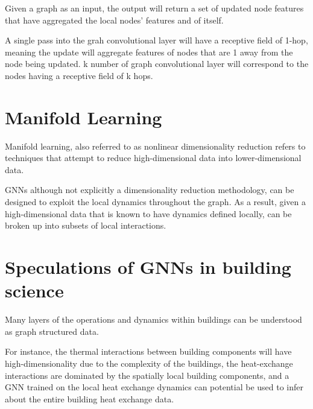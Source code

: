 \documentclass[12pt]{article}
\begin{document}
Given a graph as an input, the output will return a set of updated node features that have aggregated the local nodes' features and of itself.

A single pass into the grah convolutional layer will have a receptive field of 1-hop, meaning the update will aggregate features of nodes that are 1 away from the node being updated. k number of graph convolutional layer will correspond to the nodes having a receptive field of k hops.

\section{Manifold Learning}
Manifold learning, also referred to as nonlinear dimensionality reduction refers to techniques that attempt to reduce high-dimensional data into lower-dimensional data.

GNNs although not explicitly a dimensionality reduction methodology, can be designed to exploit the local dynamics throughout the graph. As a result, given a high-dimensional data that is known to have dynamics defined locally, can be broken up into subsets of local interactions.

\section{Speculations of GNNs in building science}
Many layers of the operations and dynamics within buildings can be understood as graph structured data.

For instance, the thermal interactions between building components will have high-dimensionality due to the complexity of the buildings, the heat-exchange interactions are dominated by the spatially local building components, and a GNN trained on the local heat exchange dynamics can potential be used to infer about the entire building heat exchange data.
\end{document}
